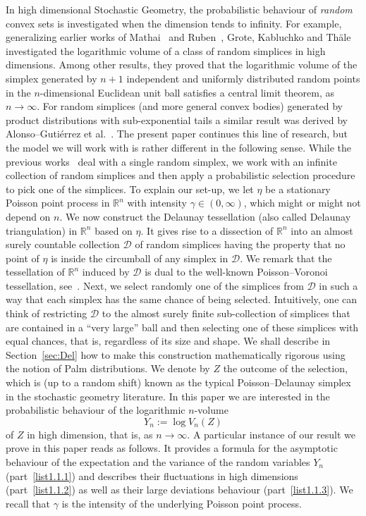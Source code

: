 \documentclass[10pt]{amsart}
\theoremstyle{definition}\newtheorem{defi}[theo]{Definition}\newtheorem{rema}[theo]{Remark}\newtheorem{exam}[theo]{Example}\newtheorem{exem}[theo]{Example}\newtheorem{nota}[theo]{Notation}
\newcommand{\R}{\mathbb{R}}
\newcommand{\dscr}{\mathcal{D}}
\begin{document}
In high dimensional Stochastic Geometry, the probabilistic behaviour of \emph{random} convex sets is investigated when the dimension tends to infinity. For example, generalizing earlier works of Mathai~\cite{Mathai82} and Ruben~\cite{Ruben77}, Grote, Kabluchko and Th\"ale~\cite{GKT17} investigated the logarithmic volume of a class of random simplices in high dimensions. Among other results, they proved that the logarithmic volume of the simplex generated by $n+1$ independent and uniformly distributed random points in the $n$-dimensional Euclidean unit ball satisfies a central limit theorem, as $n\to\infty$. For random simplices (and more general convex bodies) generated by product distributions with sub-exponential tails a similar result was derived by Alonso--Gutiérrez et al.~\cite{Oberwolfach}. The present paper continues this line of research, but the model we will work with is rather different in the following sense. While the previous works~\cite{Oberwolfach,GKT17,Mathai82,Ruben77} deal with a single random simplex, we work with an infinite collection of random simplices and then apply a probabilistic selection procedure to pick one of the simplices. To explain our set-up, we let $\eta$ be a stationary Poisson point process in $\R^n$ with intensity $\gamma\in(0,\infty)$, which might or might not depend on $n$. We now construct the Delaunay tessellation (also called Delaunay triangulation) in $\R^n$ based on $\eta$. It gives rise to a dissection of $\R^n$ into an almost surely countable collection $\dscr$ of random simplices having the property that no point of $\eta$ is inside the circumball of any simplex in $\dscr$. We remark that the tessellation of $\R^n$ induced by $\dscr$ is dual to the well-known Poisson--Voronoi tessellation, see~\cite[Section~10.2]{SW08}. Next, we select randomly one of the simplices from $\dscr$ in such a way that each simplex has the same chance of being selected. Intuitively, one can think of restricting $\dscr$ to the almost surely finite sub-collection of simplices that are contained in a ``very large'' ball and then selecting one of these simplices with equal chances, that is, regardless of its size and shape. We shall describe in Section~\ref{sec:Del} how to make this construction mathematically rigorous using the notion of Palm distributions. We denote by $Z$ the outcome of the selection, which is (up to a random shift) known as the typical Poisson--Delaunay simplex in the stochastic geometry literature. In this paper we are interested in the probabilistic behaviour of the logarithmic $n$-volume
\[
Y_n:=\log V_n(Z)
\]
of $Z$ in high dimension, that is, as $n\to\infty$. A particular instance of our result we prove in this paper reads as follows. It provides a formula for the asymptotic behaviour of the expectation and the variance of the random variables $Y_n$ (part~\eqref{list1.1.1}) and describes their fluctuations in high dimensions (part~\eqref{list1.1.2}) as well as their large deviations behaviour (part~\eqref{list1.1.3}). We recall that $\gamma$ is the intensity of the underlying Poisson point process.
\end{document}
